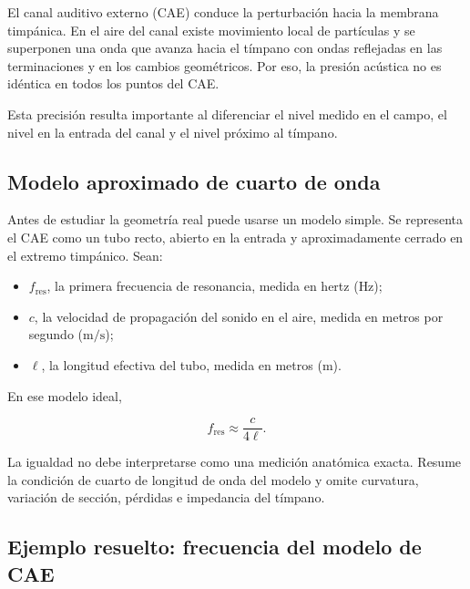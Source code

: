El canal auditivo externo (CAE) conduce la perturbación hacia la membrana
timpánica. En el aire del canal existe movimiento local de partículas y se
superponen una onda que avanza hacia el tímpano con ondas reflejadas en las
terminaciones y en los cambios geométricos. Por eso, la presión acústica no es
idéntica en todos los puntos del CAE.

Esta precisión resulta importante al diferenciar el nivel medido en el campo,
el nivel en la entrada del canal y el nivel próximo al tímpano.

\subsection{Modelo aproximado de cuarto de onda}
\label{sec:u6-modelo-cae}

Antes de estudiar la geometría real puede usarse un modelo simple. Se
representa el CAE como un tubo recto, abierto en la entrada y aproximadamente
cerrado en el extremo timpánico. Sean:

\begin{itemize}
    \item \(f_\mathrm{res}\), la primera frecuencia de resonancia, medida en
    hertz (\(\text{Hz}\));
    \item \(c\), la velocidad de propagación del sonido en el aire, medida en
    metros por segundo (\(\text{m}/\text{s}\));
    \item \(\ell\), la longitud efectiva del tubo, medida en metros
    (\(\text{m}\)).
\end{itemize}

En ese modelo ideal,

\begin{equation}
    f_\mathrm{res}\approx\frac{c}{4\ell}.
    \label{eq:u6-resonancia-cae}
\end{equation}

La igualdad no debe interpretarse como una medición anatómica exacta. Resume
la condición de cuarto de longitud de onda del modelo y omite curvatura,
variación de sección, pérdidas e impedancia del tímpano.

\subsection{Ejemplo resuelto: frecuencia del modelo de CAE}
\label{sec:u6-ejemplo-cae}

